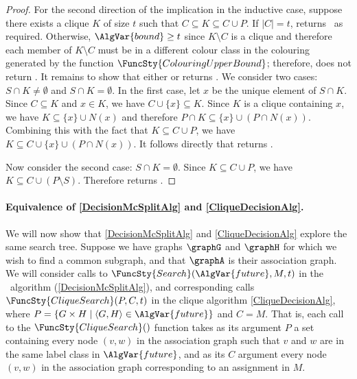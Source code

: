 \begin{proof}
  For the second direction of the implication in the inductive case, suppose there exists a clique
  $K$ of size $t$ such that $C \subseteq K \subseteq C \cup P$.  If $|C|=t$, 
  returns \boolT\ as required.  Otherwise, $\AlgVar{bound} \geq t$ since $K \setminus C$ is a clique
  and therefore each member of $K \setminus C$ must be in a different colour class in the colouring
    generated by the function $\FuncSty{ColouringUpperBound}$; therefore, 
    does not return \boolF.  It remains to show that either 
   or  returns \boolT. We consider two
  cases: $S \cap K \not= \emptyset$ and $S \cap K = \emptyset$.  In the first case, let $x$ be
  the unique element of $S \cap K$.  Since $C \subseteq K$ and $x \in K$, we have
  $C \cup \{x\} \subseteq K$.
  Since $K$ is a clique containing $x$, we have $K \subseteq \{x\} \cup N(x)$ and
    therefore $P \cap K \subseteq \{x\} \cup (P \cap N(x))$.
  Combining this with the fact that $K \subseteq C \cup P$,
  we have $K \subseteq C \cup \{x\} \cup (P \cap N(x))$.  It follows directly that 
  returns \boolT.

    Now consider the second case: $S \cap K = \emptyset$.  Since $K \subseteq C \cup P$,
    we have $K \subseteq C \cup (P \setminus S)$.  Therefore 
    returns \boolT.
\end{proof}

\paragraph{Equivalence of \cref{DecisionMcSplitAlg} and
\cref{CliqueDecisionAlg}.}  We will now show that \cref{DecisionMcSplitAlg} and
\cref{CliqueDecisionAlg} explore the same search tree.  Suppose we have graphs
$\graphG$ and $\graphH$ for which we wish to find a common subgraph, and that
$\graphA$ is their association graph.  We will consider calls to
$\FuncSty{Search}(\AlgVar{future},M,t)$ in the \McSplit\
algorithm (\cref{DecisionMcSplitAlg}), and corresponding calls
$\FuncSty{CliqueSearch}(P,C,t)$ in the clique algorithm
\cref{CliqueDecisionAlg}, where $P = \{G \times H \mid \langle G,H \rangle \in
\AlgVar{future}\}$ and $C = M$.  That is, each call to the
$\FuncSty{CliqueSearch}()$ function takes as its argument $P$ a set containing
every node $(v,w)$ in the association graph such that $v$ and $w$ are in the
same label class in $\AlgVar{future}$, and as its $C$ argument every node
$(v,w)$ in the association graph corresponding to an assignment in $M$.

